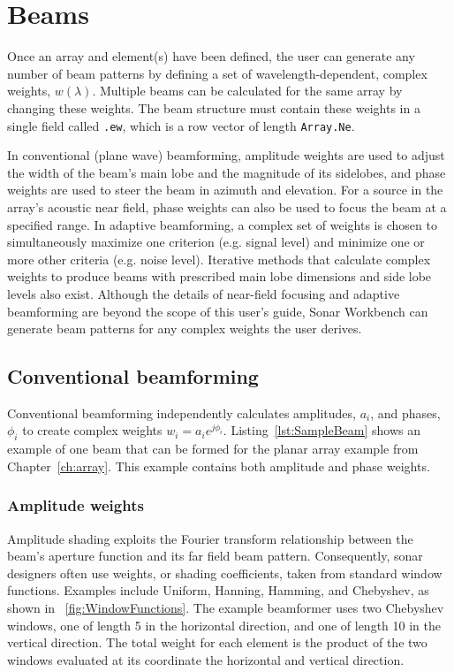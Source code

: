 \chapter{Beams}\label{ch:beam}

Once an array and element(s) have been defined, the user can generate any number of beam patterns by defining a set of wavelength-dependent, complex weights, $w(\lambda)$. Multiple beams can be calculated for the same array by changing these weights. The beam structure must contain these weights in a single field called \texttt{.ew}, which is a row vector of length \texttt{Array.Ne}.

In conventional (plane wave) beamforming, amplitude weights are used to adjust the width of the beam's main lobe and the magnitude of its sidelobes, and phase weights are used to steer the beam in azimuth and elevation. For a source in the array's acoustic near field, phase weights can also be used to focus the beam at a specified range. In adaptive beamforming, a complex set of weights is chosen to simultaneously maximize one criterion (e.g. signal level) and minimize one or more other criteria (e.g. noise level). Iterative methods that calculate complex weights to produce beams with prescribed main lobe dimensions and side lobe levels also exist.  Although the details of near-field focusing and adaptive beamforming are beyond the scope of this user's guide, Sonar Workbench can generate beam patterns for any complex weights the user derives.

\section{Conventional beamforming}

Conventional beamforming independently calculates amplitudes, $a_i$, and phases, $\phi_i$ to create complex weights $w_i=a_ie^{j\phi_i}$. Listing~\ref{lst:SampleBeam} shows an example of one beam that can be formed for the planar array example from Chapter~\ref{ch:array}. This example contains both amplitude and phase weights.



\subsection{Amplitude weights}

Amplitude shading exploits the Fourier transform relationship between the beam's aperture function and its far field beam pattern. Consequently, sonar designers often use weights, or shading coefficients, taken from standard window functions. Examples include Uniform, Hanning, Hamming, and Chebyshev, as shown in \figname~\ref{fig:WindowFunctions}. The example beamformer uses two Chebyshev windows, one of length 5 in the horizontal direction, and one of length 10 in the vertical direction. The total weight for each element is the product of the two windows evaluated at its coordinate the horizontal and vertical direction.

